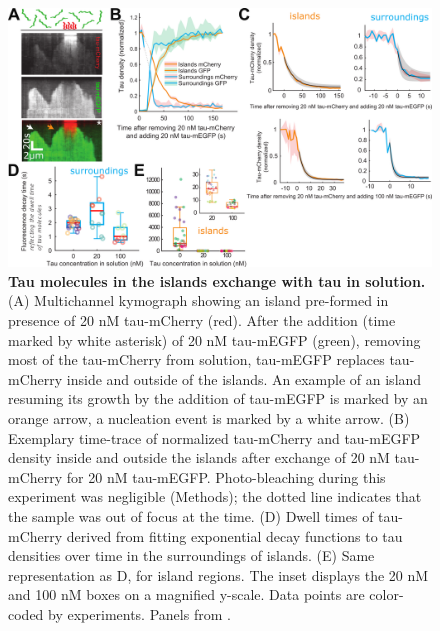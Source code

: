 \begin{figure}[h!]
	\centering
	\includegraphics[width=1\linewidth]{Figures/tau_EXCHANGE.png}
	\caption[Tau molecules in the islands exchange with tau in solution.]{
	\textbf{Tau molecules in the islands exchange with tau in solution.} (A) Multichannel kymograph showing an island pre-formed in presence of 20 nM tau-mCherry (red). After the addition (time marked by white asterisk) of 20 nM tau-mEGFP (green), removing most of the tau-mCherry from solution, tau-mEGFP replaces tau-mCherry inside and outside of the islands. An example of an island resuming its growth by the addition of tau-mEGFP is marked by an orange arrow, a nucleation event is marked by a white arrow. (B) Exemplary time-trace of normalized tau-mCherry and tau-mEGFP density inside and outside the islands after exchange of 20 nM tau-mCherry for 20 nM tau-mEGFP. Photo-bleaching during this experiment was negligible (Methods); the dotted line indicates that the sample was out of focus at the time. (D) Dwell times of tau-mCherry derived from fitting exponential decay functions to tau densities over time in the surroundings of islands. (E) Same representation as D, for island regions. The inset displays the 20 nM and 100 nM boxes on a magnified y-scale. Data points are color-coded by experiments. Panels from \cite{Siahaan2019a}.
		}\label{tauexchange}
\end{figure}

